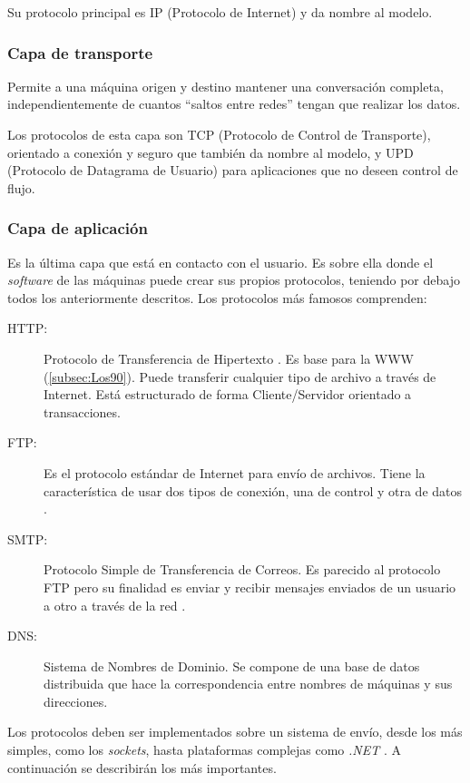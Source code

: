 Su protocolo principal es IP (Protocolo de Internet) y da nombre al 
modelo.

\subsubsection*{Capa de transporte}
Permite a una máquina origen y destino mantener una conversación 
completa, independientemente de cuantos ``saltos entre redes'' tengan 
que realizar los datos.

Los protocolos de esta capa son TCP (Protocolo de Control de 
Transporte), orientado a conexión y seguro que también da nombre al modelo, y 
UPD (Protocolo de Datagrama de Usuario) para aplicaciones que no 
deseen control de flujo.

\subsubsection*{Capa de aplicación}
Es la última capa que está en contacto con el usuario. Es sobre ella 
donde el \emph{software} de las máquinas puede crear sus propios 
protocolos, teniendo por debajo todos los anteriormente descritos. Los 
protocolos más famosos comprenden:

\begin{description}
	\item[HTTP:] Protocolo de Transferencia de Hipertexto 
	\cite{CommYRedes}. Es base para la WWW (\ref{subsec:Los90}). Puede 
	transferir cualquier tipo de archivo a través de Internet. Está 
	estructurado de forma Cliente/Servidor orientado a transacciones.
	\item[FTP:] Es el protocolo estándar de Internet para envío de 
	archivos. Tiene la característica de usar dos tipos de conexión, 
	una de control y otra de datos \cite{TCPIllustrated}.
	\item[SMTP:] Protocolo Simple de Transferencia de Correos. Es 
	parecido al protocolo FTP pero su finalidad es enviar y recibir 
	mensajes enviados de un usuario a otro a través de la red 
	\cite{TCPIllustrated}.
	\item[DNS:] Sistema de Nombres de Dominio. Se compone de una base 
	de datos distribuida que hace la correspondencia entre nombres de 
	máquinas y sus direcciones.
\end{description}

Los protocolos deben ser implementados sobre un sistema de envío, 
desde los más simples, como los \emph{sockets}, hasta plataformas 
complejas como \emph{.NET} . A continuación se describirán los más 
importantes.

